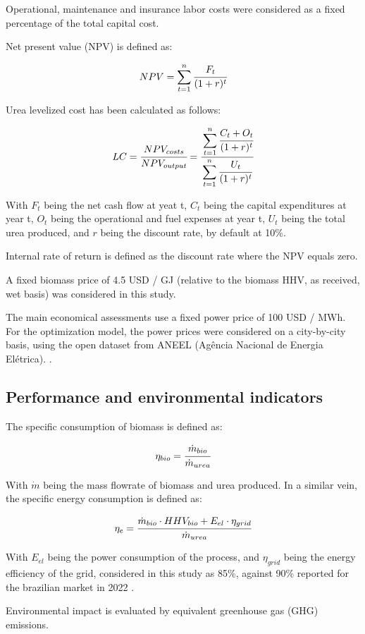 \documentclass[a4paper, titlepage]{article}
\begin{document}
\begin{table}
\end{table}

Operational, maintenance and insurance labor costs were considered as a fixed percentage of the total capital cost.

Net present value (NPV) is defined as:

\begin{equation}
	NPV = \sum_{t=1}^n \cfrac{F_t}{(1+r)^t}
\end{equation}

Urea levelized cost has been calculated as follows:

\begin{equation}
	LC = \cfrac{NPV_{costs}}{NPV_{output}} = \cfrac{\displaystyle\sum_{t=1}^n \cfrac{C_t + O_t}{(1+r)^t}}{\displaystyle\sum_{t=1}^n \cfrac{U_t}{(1+r)^t}}
\end{equation}

With $F_t$ being the net cash flow at yeat t, $C_t$ being the capital expenditures at year t, $O_t$ being the
operational and fuel expenses at year t, $U_t$ being the total urea produced, and $r$ being the discount rate,
by default at 10\%.

Internal rate of return is defined as the discount rate where the NPV equals zero.

A fixed biomass price of 4.5 USD / GJ (relative to the biomass HHV, as received, wet basis) was considered in this study.

The main economical assessments use a fixed power price of 100 USD / MWh. For the optimization model, the power prices
were considered on a city-by-city basis, using the open dataset from ANEEL (Agência Nacional de Energia Elétrica).
\cite{ANEELPortalReports}.

\subsection{Performance and environmental indicators}

The specific consumption of biomass is defined as:

\begin{equation}
	\eta_{bio} = \cfrac{\dot m_{bio}}{\dot m_{urea}}
\end{equation}

With $\dot m$ being the mass flowrate of biomass and urea produced. In a similar vein, the specific energy consumption
is defined as:

\begin{equation}
	\eta _e = \cfrac{\dot m_{bio} \cdot HHV_{bio} + E_{el} \cdot \eta _{grid}}{\dot m_{urea}}
\end{equation}

With $E_{el}$ being the power consumption of the process, and $\eta _{grid}$ being the energy efficiency of the grid,
considered in this study as 85\%, against 90\% reported for the brazilian market in 2022
\cite{epeBENBalancoEnergetico2023}.

Environmental impact is evaluated by equivalent greenhouse gas (GHG) emissions. \textcite{jonkerEconomicPerformanceGHG2019}








\printbibliography{}
\end{document}
